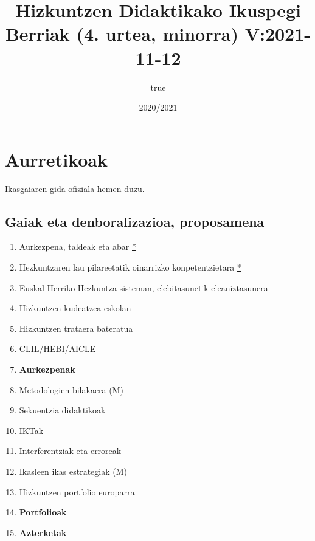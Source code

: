 \documentclass[
]{book}
\title{Hizkuntzen Didaktikako Ikuspegi Berriak (4. urtea, minorra) V:2021-11-12}
\author{true}
\date{2020/2021}
\providecommand{\tightlist}{%
  \setlength{\itemsep}{0pt}\setlength{\parskip}{0pt}}
\begin{document}
\maketitle

{
\setcounter{tocdepth}{1}
\tableofcontents
}
\hypertarget{aurretikoak}{%
\chapter*{Aurretikoak}\label{aurretikoak}}

Ikasgaiaren gida ofiziala \href{https://www.ehu.eus/eu/lehen-hezkuntzako-gradua-bizkaia/kreditu-eta-irakasgaiak?p_redirect=consultaAsignatura\&p_cod_proceso=egr\&p_anyo_acad=20190\&p_ciclo=X\&p_curso=4\&p_cod_asignatura=27574}{hemen} duzu.

\hypertarget{gaiak-eta-denboralizazioa-proposamena}{%
\section*{Gaiak eta denboralizazioa, proposamena}\label{gaiak-eta-denboralizazioa-proposamena}}

\begin{enumerate}
\def\labelenumi{\arabic{enumi})}
\tightlist
\item
  Aurkezpena, taldeak eta abar \href{../diapoak/0-Aurkezpena-21.pdf}{*}
\item
  Hezkuntzaren lau pilareetatik oinarrizko konpetentzietara \href{../diapoak/01-diapo.html}{*}
\item
  Euskal Herriko Hezkuntza sisteman, elebitasunetik eleaniztasunera
\item
  Hizkuntzen kudeatzea eskolan
\item
  Hizkuntzen trataera bateratua
\item
  CLIL/HEBI/AICLE
\item
  \textbf{Aurkezpenak}
\item
  Metodologien bilakaera (M)
\item
  Sekuentzia didaktikoak
\item
  IKTak
\item
  Interferentziak eta erroreak
\item
  Ikasleen ikas estrategiak (M)
\item
  Hizkuntzen portfolio europarra
\item
  \textbf{Portfolioak}
\item
  \textbf{Azterketak}
\end{enumerate}
\end{document}

